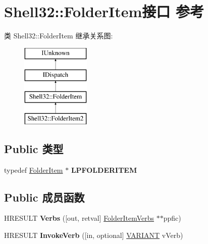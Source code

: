 \hypertarget{interface_shell32_1_1_folder_item}{}\section{Shell32\+:\+:Folder\+Item接口 参考}
\label{interface_shell32_1_1_folder_item}
类 Shell32\+:\+:Folder\+Item 继承关系图\+:\begin{figure}[H]
\begin{center}
\leavevmode
\includegraphics[height=4.000000cm]{interface_shell32_1_1_folder_item}
\end{center}
\end{figure}
\subsection*{Public 类型}
\begin{DoxyCompactItemize}
\item 
\mbox{\label{interface_shell32_1_1_folder_item_a2bb75dff1e344cd57e33c0bb4cea075b}} 
typedef \hyperlink{interface_shell32_1_1_folder_item}{Folder\+Item} $\ast$ {\bfseries L\+P\+F\+O\+L\+D\+E\+R\+I\+T\+EM}
\end{DoxyCompactItemize}
\subsection*{Public 成员函数}
\begin{DoxyCompactItemize}
\item 
\mbox{\label{interface_shell32_1_1_folder_item_aa77e9f03973ddeca9bea0b8b511b6f85}} 
H\+R\+E\+S\+U\+LT {\bfseries Verbs} (\mbox{[}out, retval\mbox{]} \hyperlink{interface_shell32_1_1_folder_item_verbs}{Folder\+Item\+Verbs} $\ast$$\ast$ppfic)
\item 
\mbox{\label{interface_shell32_1_1_folder_item_a8c0c5eaa9c4d29300adb77c99430ca17}} 
H\+R\+E\+S\+U\+LT {\bfseries Invoke\+Verb} (\mbox{[}in, optional\mbox{]} \hyperlink{structtag_v_a_r_i_a_n_t}{V\+A\+R\+I\+A\+NT} v\+Verb)
\end{DoxyCompactItemize}
